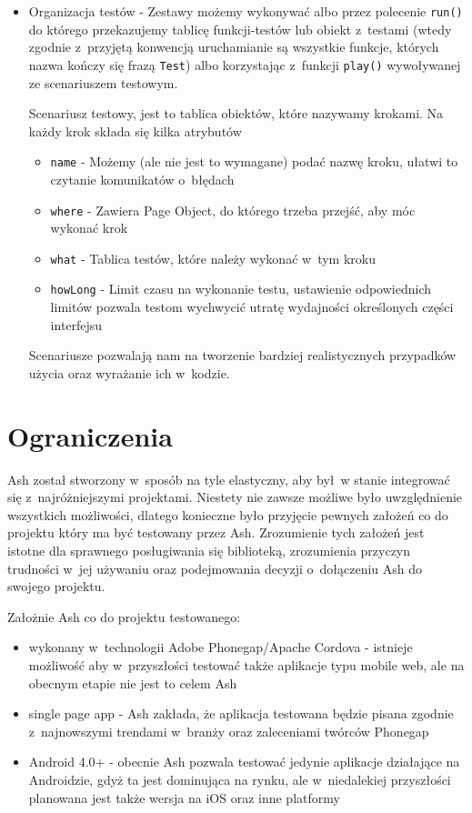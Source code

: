 \documentclass[brudnopis]{xmgr}
\begin{document}
\begin{itemize}
 \item Organizacja testów - Zestawy możemy wykonywać albo przez polecenie \texttt{run()} do którego przekazujemy tablicę funkcji-testów lub obiekt z~testami (wtedy zgodnie z~przyjętą konwencją uruchamianie są wszystkie funkcje, których nazwa kończy się frazą \texttt{Test}) albo korzystając z~funkcji \texttt{play()} wywoływanej ze scenariuszem testowym.

Scenariusz testowy, jest to tablica obiektów, które nazywamy krokami. Na każdy krok składa się kilka atrybutów

  \begin{itemize}
    \item \texttt{name} - Możemy (ale nie jest to wymagane) podać nazwę kroku, ułatwi to czytanie komunikatów o~błędach
    \item \texttt{where} - Zawiera Page Object, do którego trzeba przejść, aby móc wykonać krok 
    \item \texttt{what} - Tablica testów, które należy wykonać w~tym kroku
    \item \texttt{howLong} - Limit czasu na wykonanie testu, ustawienie odpowiednich limitów pozwala testom wychwycić utratę wydajności określonych części interfejsu
  \end{itemize}

Scenariusze pozwalają nam na tworzenie bardziej realistycznych przypadków użycia oraz wyrażanie ich w~kodzie. 

\end{itemize}

\section{Ograniczenia}

Ash został stworzony w~sposób na tyle elastyczny, aby był~w stanie integrować się z~najróżniejszymi projektami. Niestety nie zawsze możliwe było uwzględnienie wszystkich możliwości, dlatego konieczne było przyjęcie pewnych założeń co do projektu który ma być testowany przez Ash. Zrozumienie tych założeń jest istotne dla sprawnego posługiwania się biblioteką, zrozumienia przyczyn trudności w~jej używaniu oraz podejmowania decyzji o~dołączeniu Ash do swojego projektu.

Założnie Ash co do projektu testowanego:

\begin{itemize}
  \item wykonany w~technologii Adobe Phonegap/Apache Cordova - istnieje możliwość aby w~przyszłości testować także aplikacje typu mobile web, ale na obecnym etapie nie jest to celem Ash
  \item single page app - Ash zakłada, że aplikacja testowana będzie pisana zgodnie z~najnowszymi trendami w~branży oraz zaleceniami twórców Phonegap
  \item Android 4.0+ - obecnie Ash pozwala testować jedynie aplikacje działające na Androidzie, gdyż ta jest dominująca na rynku, ale w~niedalekiej przyszłości planowana jest także wersja na iOS oraz inne platformy
\end{itemize}
\end{document}
